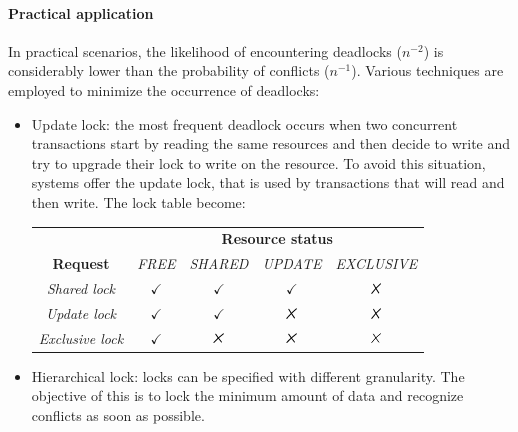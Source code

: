 \paragraph*{Practical application}
In practical scenarios, the likelihood of encountering deadlocks ($n^{-2}$) is considerably lower than the probability of conflicts ($n^{-1}$).
Various techniques are employed to minimize the occurrence of deadlocks:
\begin{itemize}
    \item Update lock: the most frequent deadlock occurs when two concurrent transactions start by reading the same resources and then decide to write and try to upgrade their lock to write on the resource. 
    To avoid this situation, systems offer the update lock, that is used by transactions that will read and then write. 
    The lock table become: 
    \begin{table}[H]
        \centering
        \begin{tabular}{ccccc}
        \textbf{}                                     & \multicolumn{4}{c}{\textbf{Resource status}}                                                                                                        \\ \cline{2-5} 
        \multicolumn{1}{c|}{\textbf{Request}}         & \textit{FREE}                     & \textit{SHARED}                   & \textit{UPDATE}                   & \multicolumn{1}{c|}{\textit{EXCLUSIVE}} \\ \hline
        \multicolumn{1}{|c|}{\textit{Shared lock}}    & \multicolumn{1}{c|}{$\checkmark$} & \multicolumn{1}{c|}{$\checkmark$} & \multicolumn{1}{c|}{$\checkmark$} & \multicolumn{1}{c|}{$\tikzxmark$}       \\ \hline
        \multicolumn{1}{|c|}{\textit{Update lock}}    & \multicolumn{1}{c|}{$\checkmark$} & \multicolumn{1}{c|}{$\checkmark$} & \multicolumn{1}{c|}{$\tikzxmark$} & \multicolumn{1}{c|}{$\tikzxmark$}       \\ \hline
        \multicolumn{1}{|c|}{\textit{Exclusive lock}} & \multicolumn{1}{c|}{$\checkmark$} & \multicolumn{1}{c|}{$\tikzxmark$} & \multicolumn{1}{c|}{$\tikzxmark$} & \multicolumn{1}{c|}{$\tikzxmark$}       \\ \hline
        \end{tabular}
    \end{table}
    \item Hierarchical lock: locks can be specified with different granularity. 
        The objective of this is to lock the minimum amount of data and recognize conflicts as soon as possible.

\end{itemize}
